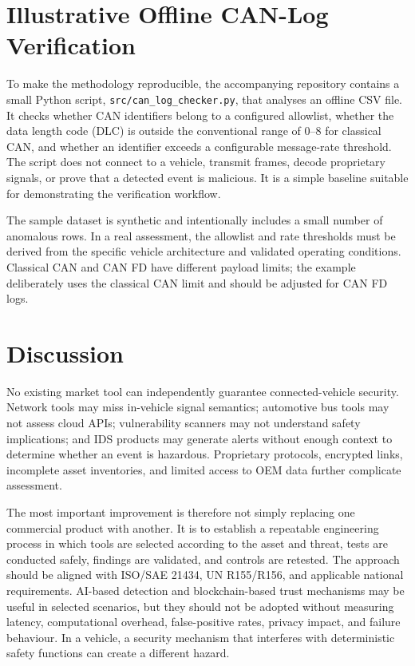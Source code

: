 \documentclass[11pt]{article}
\begin{document}
\section{Illustrative Offline CAN-Log Verification}
To make the methodology reproducible, the accompanying repository contains a small Python script, \texttt{src/can\_log\_checker.py}, that analyses an offline CSV file. It checks whether CAN identifiers belong to a configured allowlist, whether the data length code (DLC) is outside the conventional range of 0--8 for classical CAN, and whether an identifier exceeds a configurable message-rate threshold. The script does not connect to a vehicle, transmit frames, decode proprietary signals, or prove that a detected event is malicious. It is a simple baseline suitable for demonstrating the verification workflow.

The sample dataset is synthetic and intentionally includes a small number of anomalous rows. In a real assessment, the allowlist and rate thresholds must be derived from the specific vehicle architecture and validated operating conditions. Classical CAN and CAN FD have different payload limits; the example deliberately uses the classical CAN limit and should be adjusted for CAN FD logs.

\section{Discussion}
No existing market tool can independently guarantee connected-vehicle security. Network tools may miss in-vehicle signal semantics; automotive bus tools may not assess cloud APIs; vulnerability scanners may not understand safety implications; and IDS products may generate alerts without enough context to determine whether an event is hazardous. Proprietary protocols, encrypted links, incomplete asset inventories, and limited access to OEM data further complicate assessment.

The most important improvement is therefore not simply replacing one commercial product with another. It is to establish a repeatable engineering process in which tools are selected according to the asset and threat, tests are conducted safely, findings are validated, and controls are retested. The approach should be aligned with ISO/SAE 21434, UN R155/R156, and applicable national requirements. AI-based detection and blockchain-based trust mechanisms may be useful in selected scenarios, but they should not be adopted without measuring latency, computational overhead, false-positive rates, privacy impact, and failure behaviour. In a vehicle, a security mechanism that interferes with deterministic safety functions can create a different hazard.
\end{document}
